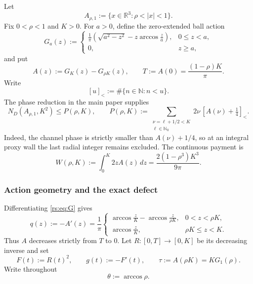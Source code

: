 
Let
\[
 A_{\rho,1}:=\{x\in\mathbb R^3:\rho<|x|<1\}.
\]
Fix $0<\rho<1$ and $K>0$.  For $a>0$, define the zero-extended ball
action
\begin{equation}
 G_a(z):=
 \begin{cases}
 \displaystyle \frac1\pi\left(\sqrt{a^2-z^2}
      -z\arccos\frac za\right),&0\leq z<a,\\[4pt]
 0,&z\geq a,
 \end{cases}
 \label{rs:eq:G}
\end{equation}
and put
\begin{equation}
 A(z):=G_K(z)-G_{\rho K}(z),
 \qquad
 T:=A(0)=\frac{(1-\rho)K}{\pi}.
 \label{rs:eq:A-T}
\end{equation}
Write
\[
 [u]_<:=\#\{n\in\mathbb N:n<u\}.
\]
The phase reduction in the main paper supplies
\begin{equation}
 N_D(A_{\rho,1},K^2)\leq P(\rho,K),
 \qquad
 P(\rho,K):=
 \sum_{\substack{\nu=\ell+1/2<K\\ \ell\in\mathbb N_0}}
 2\nu\,[A(\nu)+\tfrac14]_<.
 \label{rs:eq:phase-proxy}
\end{equation}
Indeed, the channel phase is strictly smaller than $A(\nu)+1/4$, so at an
integral proxy wall the last radial integer remains excluded.  The
continuous payment is
\begin{equation}
 W(\rho,K):=\int_0^K2zA(z)\,dz
 =\frac{2(1-\rho^3)K^3}{9\pi}.
 \label{rs:eq:W}
\end{equation}

\subsubsection*{Action geometry and the exact defect}

Differentiating \eqref{rs:eq:G} gives
\begin{equation}
 q(z):=-A'(z)=\frac1\pi
 \begin{cases}
 \displaystyle
 \arccos\frac zK-\arccos\frac z{\rho K},&0<z<\rho K,\\[6pt]
 \displaystyle \arccos\frac zK,&\rho K\leq z<K.
 \end{cases}
 \label{rs:eq:q}
\end{equation}
Thus $A$ decreases strictly from $T$ to $0$.  Let
$R:[0,T]\to[0,K]$ be its decreasing inverse and set
\begin{equation}
 F(t):=R(t)^2,
 \qquad g(t):=-F'(t),
 \qquad \tau:=A(\rho K)=KG_1(\rho).
 \label{rs:eq:inverse-data}
\end{equation}
Write throughout
\[
 \theta:=\arccos\rho.
\]

